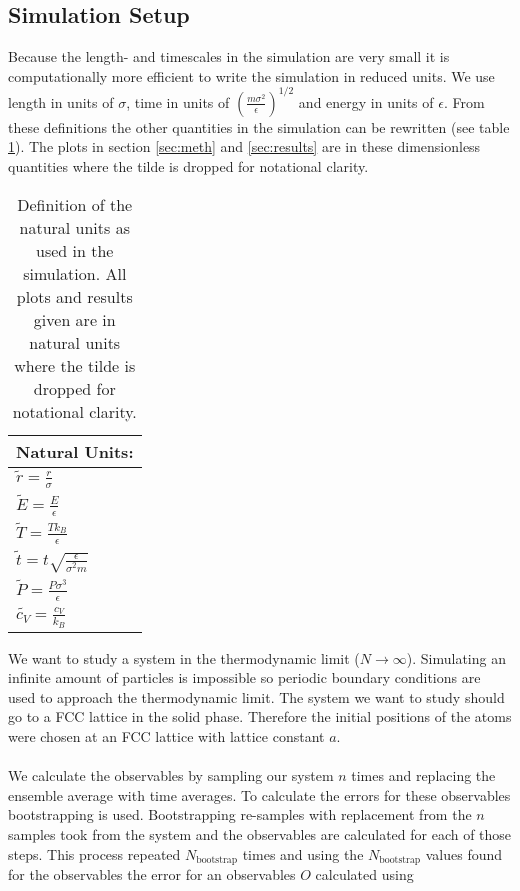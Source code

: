 \documentclass[10 pt, a4paper]{article}
\begin{document}
\subsection{Simulation Setup} \label{sec:simsetup}

Because the length- and timescales in the simulation are very small it is computationally more efficient to write the simulation in reduced units. We use length in units of $\sigma$, time in units of $\left( \frac{m \sigma^2}{\epsilon} \right)^{1/2}$ and energy in units of $\epsilon$. From these definitions the other quantities in the simulation can be rewritten (see table \ref{tab:natunits}).  The plots in section \ref{sec:meth} and \ref{sec:results} are in these dimensionless quantities where the tilde is dropped for notational clarity.

\begin{table}[H] 
\centering
\begin{tabular}{l}
Natural Units:                                     \\ \hline
$\tilde{r} = \frac{r}{\sigma}$                     \\
$\tilde{E} = \frac{E}{\epsilon}$                   \\
$\tilde{T} = \frac{T k_B}{\epsilon}$               \\
$\tilde{t} = t \sqrt{\frac{\epsilon}{\sigma^2 m}}$ \\
$\tilde{P} = \frac{P \sigma^3}{\epsilon}$     \\
$\tilde{c_V} = \frac{c_V}{k_B}$   
\end{tabular}
\caption{Definition of the natural units as used in the simulation. All plots and results given are in natural units where the tilde is dropped for notational clarity.  \label{tab:natunits}}
\end{table}

We want to study a system in the thermodynamic limit ($N \to \infty$). Simulating an infinite amount of particles is impossible so periodic boundary conditions are used to approach the thermodynamic limit. The system we want to study should go to a FCC lattice in the solid phase. Therefore the initial positions of the atoms were chosen at an FCC lattice with lattice constant $a$.
\\
\\
We calculate the observables by sampling our system $n$ times and replacing the ensemble average with time averages. To calculate the errors for these observables bootstrapping is used. Bootstrapping re-samples with replacement from the $n$ samples took from the system and the observables are calculated for each of those steps. This process repeated $N_{\mathrm{bootstrap}}$ times and using the $N_{\mathrm{bootstrap}}$ values found for the observables the error for an observables $O$ calculated using
\end{document}
